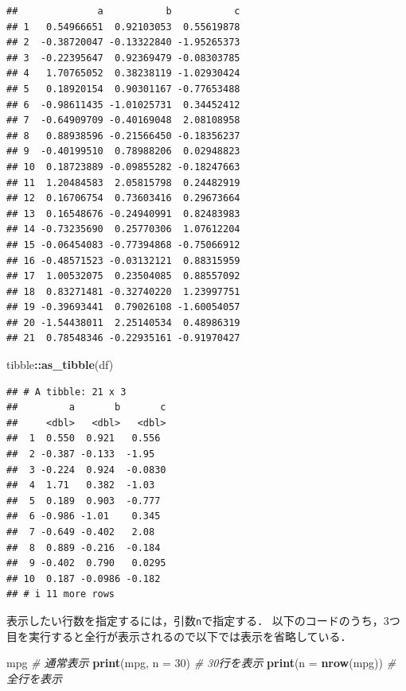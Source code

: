 \documentclass[
]{article}
\newenvironment{Shaded}{\begin{snugshade}}{\end{snugshade}}
\newcommand{\AttributeTok}[1]{\textcolor[rgb]{0.13,0.29,0.53}{#1}}
\newcommand{\CommentTok}[1]{\textcolor[rgb]{0.56,0.35,0.01}{\textit{#1}}}
\newcommand{\DecValTok}[1]{\textcolor[rgb]{0.00,0.00,0.81}{#1}}
\newcommand{\FunctionTok}[1]{\textcolor[rgb]{0.13,0.29,0.53}{\textbf{#1}}}
\newcommand{\NormalTok}[1]{#1}
\newcommand{\SpecialCharTok}[1]{\textcolor[rgb]{0.81,0.36,0.00}{\textbf{#1}}}
\begin{document}
\begin{verbatim}
##              a           b           c
## 1   0.54966651  0.92103053  0.55619878
## 2  -0.38720047 -0.13322840 -1.95265373
## 3  -0.22395647  0.92369479 -0.08303785
## 4   1.70765052  0.38238119 -1.02930424
## 5   0.18920154  0.90301167 -0.77653488
## 6  -0.98611435 -1.01025731  0.34452412
## 7  -0.64909709 -0.40169048  2.08108958
## 8   0.88938596 -0.21566450 -0.18356237
## 9  -0.40199510  0.78988206  0.02948823
## 10  0.18723889 -0.09855282 -0.18247663
## 11  1.20484583  2.05815798  0.24482919
## 12  0.16706754  0.73603416  0.29673664
## 13  0.16548676 -0.24940991  0.82483983
## 14 -0.73235690  0.25770306  1.07612204
## 15 -0.06454083 -0.77394868 -0.75066912
## 16 -0.48571523 -0.03132121  0.88315959
## 17  1.00532075  0.23504085  0.88557092
## 18  0.83271481 -0.32740220  1.23997751
## 19 -0.39693441  0.79026108 -1.60054057
## 20 -1.54438011  2.25140534  0.48986319
## 21  0.78548346 -0.22935161 -0.91970427
\end{verbatim}

\begin{Shaded}
\begin{Highlighting}[]
\NormalTok{tibble}\SpecialCharTok{::}\FunctionTok{as\_tibble}\NormalTok{(df)}
\end{Highlighting}
\end{Shaded}

\begin{verbatim}
## # A tibble: 21 x 3
##         a       b       c
##     <dbl>   <dbl>   <dbl>
##  1  0.550  0.921   0.556 
##  2 -0.387 -0.133  -1.95  
##  3 -0.224  0.924  -0.0830
##  4  1.71   0.382  -1.03  
##  5  0.189  0.903  -0.777 
##  6 -0.986 -1.01    0.345 
##  7 -0.649 -0.402   2.08  
##  8  0.889 -0.216  -0.184 
##  9 -0.402  0.790   0.0295
## 10  0.187 -0.0986 -0.182 
## # i 11 more rows
\end{verbatim}

表示したい行数を指定するには，引数\texttt{n}で指定する．
以下のコードのうち，3つ目を実行すると全行が表示されるので以下では表示を省略している．

\begin{Shaded}
\begin{Highlighting}[]
\NormalTok{mpg                  }\CommentTok{\# 通常表示}
\FunctionTok{print}\NormalTok{(mpg, }\AttributeTok{n =} \DecValTok{30}\NormalTok{)   }\CommentTok{\# 30行を表示}
\FunctionTok{print}\NormalTok{(}\AttributeTok{n =} \FunctionTok{nrow}\NormalTok{(mpg)) }\CommentTok{\# 全行を表示}
\end{Highlighting}
\end{Shaded}
\end{document}
